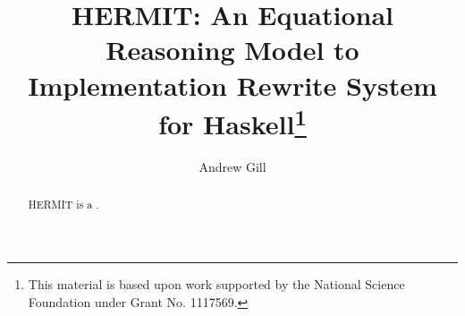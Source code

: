\documentclass[a4paper,UKenglish]{oasics}
\title{HERMIT: An Equational Reasoning Model to Implementation Rewrite System for Haskell\footnote{This material is based upon work supported by the National Science Foundation under Grant No. 1117569.}}
\author[1]{Andrew Gill}
\affil[1]{University of Kansas,\\
  Address, USA\\
  \texttt{andygill@ku.edu}}
\begin{document}
\maketitle

\begin{abstract}
HERMIT is a .
\end{abstract}
\end{document}
